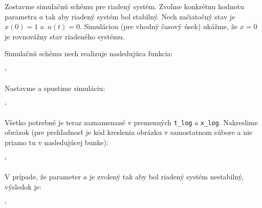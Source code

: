 \documentclass[a4paper, 10pt, ]{article}
\begin{document}
Zostavme simulačnú schému pre riadený systém. Zvoľme konkrétnu hodnotu parametra $a$ tak aby riadený systém bol stabilný. Nech začiatočný stav je $x(0) = 1$ a~$u(t)=0$. Simuláciou (pre vhodný časový úsek) ukážme, že $x = 0$ je rovnovážny stav riadeného systému.

\noindent
Simulačnú schému nech realizuje nasledujúca funkcia:

{\catcode`

}

\noindent
Nastavme a spustime simuláciu:

{\catcode`

}

Všetko potrebné je teraz zaznamenané v premenných  \lstinline{t_log} a \lstinline{x_log}. Nakreslime obrázok (pre prehľadnosť je kód kreslenia obrázku v samostatnom súbore a nie priamo tu v nasledujúcej bunke):

{\catcode`

}

\begin{centering}


    \vspace{-2mm}

    \figcaption{}

    \vspace{2mm}

    \label{figsc_ar02_fig03_0}

\end{centering}




\noindent
V prípade, že parameter $a$ je zvolený tak aby bol riadený systém nestabilný, výsledok je:



{\catcode`

}
\end{document}
